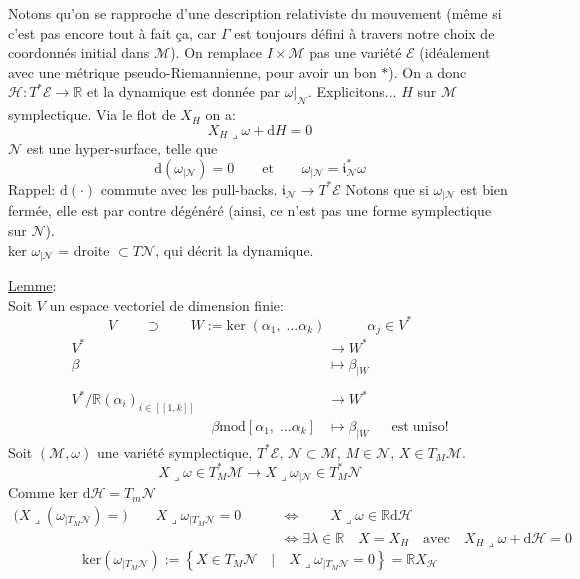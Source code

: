 \documentclass[a4paper,11pt]{article}
\renewcommand{\d}{{\mathrm{d}}}
\begin{document}
Notons qu'on se rapproche d'une description relativiste du mouvement (même si c'est pas encore tout à fait ça, car $\Gamma$ est toujours défini à travers notre choix de coordonnés initial dans $\mathcal{M}$).
On remplace $I\times\mathcal{M}$ pas une variété $\mathcal{E}$ (idéalement avec une métrique pseudo-Riemannienne, pour avoir un bon $*$). On a donc $\mathcal{H}:T^*\mathcal{E}\to\mathbb{R}$ et la dynamique est donnée par $\omega|_\mathcal{N}$. Explicitons...
$H$ sur $\mathcal{M}$ symplectique. Via le flot de $X_H$ on a:
$$X_H\lrcorner\omega+\d H = 0$$
$\mathcal{N}$ est une hyper-surface, telle que
$$\d\left(\omega_{|\mathcal{N}}\right)=0 \quad \quad \mathrm{et} \quad \quad
\omega_{|\mathcal{N}}=\mathfrak{i}_\mathcal{N}^*\omega$$
Rappel: $\d(\cdot)$ commute avec les pull-backs. \quad \quad \quad $\mathfrak{i}_\mathcal{N}\to T^*\mathcal{E}$
Notons que si $\omega_{|\mathcal{N}}$ est bien fermée, elle est par contre dégénéré (ainsi, ce n'est pas une forme symplectique sur $\mathcal{N}$).\\
ker $\omega_{|\mathcal{N}}$ = droite $\subset T\mathcal{N}$, qui décrit la dynamique.

\noindent \underline{Lemme}:\\
Soit $V$ un espace vectoriel de dimension finie:
$$V \quad \quad \supset \quad \quad W:= \mathrm{ker}\; (\alpha_1, \; ...\alpha_k) \quad \quad \quad \alpha_j \in V^*$$
\begin{align*}
V^* & \to W^* &&\\
\beta & \mapsto \beta_{|W} &&\\
\,& &&\\
V^*/\mathbb{R}(\alpha_i)_{i\in[\![1,k]\!]} & \to W^* &&\\
\quad\quad\quad\quad\quad\quad\quad\quad\quad\quad
\beta \mathrm{mod} [\alpha_1, \; ... \alpha_k] & \mapsto \beta_{|W}&&
\mathrm{est} \; \mathrm{un}\mathrm{iso}!
\end{align*}
Soit $(\mathcal{M},\omega)$ une variété symplectique, $T^*\mathcal{E}$, $\mathcal{N}\subset\mathcal{M}$, $M\in\mathcal{N}$, $X\in T_M\mathcal{M}$.
$$X\lrcorner \omega \in T_M^*\mathcal{M} \to X\lrcorner \omega_{|\mathcal{N}} \in T_M^*\mathcal{N}$$
Comme ker $\d\mathcal{H}=T_m\mathcal{N}$
\begin{align*}
\Big(X\lrcorner(\omega_{|T_M\mathcal{N}})=\Big) \quad \quad X\lrcorner \omega_{|T_M\mathcal{N}} = 0 \quad \quad &\iff \quad \quad X\lrcorner \omega \in \mathbb{R}\d \mathcal{H}\\
&\iff \exists \lambda \in \mathbb{R} \quad X = X_H \quad \mathrm{avec} \quad X_H\lrcorner\omega+\d \mathcal{H}=0
\end{align*}
$$\mathrm{ker}\left(\omega_{|T_M\mathcal{N}}\right)
:= \left\{X\in T_M\mathcal{N} \quad |\quad X\lrcorner\omega_{|T_M\mathcal{N}} = 0 \right\} = \mathbb{R}X_\mathcal{H}$$
\end{document}
